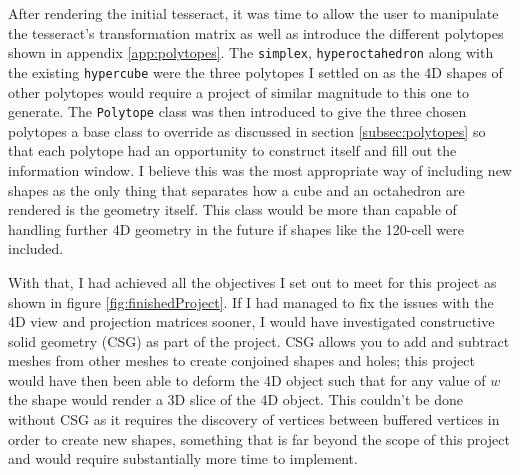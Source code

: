 \documentclass[11pt, a4paper]{article}
\begin{document}
After rendering the initial tesseract, it was time to allow the user to manipulate the tesseract's transformation matrix as well as introduce the different polytopes shown in appendix \ref{app:polytopes}. The \texttt{simplex}, \texttt{hyperoctahedron} along with the existing \texttt{hypercube} were the three polytopes I settled on as the 4D shapes of other polytopes would require a project of similar magnitude to this one to generate. The \texttt{Polytope} class was then introduced to give the three chosen polytopes a base class to override as discussed in section \ref{subsec:polytopes} so that each polytope had an opportunity to construct itself and fill out the information window. I believe this was the most appropriate way of including new shapes as the only thing that separates how a cube and an octahedron are rendered is the geometry itself. This class would be more than capable of handling further 4D geometry in the future if shapes like the 120-cell were included. 

With that, I had achieved all the objectives I set out to meet for this project as shown in figure \ref{fig:finishedProject}. If I had managed to fix the issues with the 4D view and projection matrices sooner, I would have investigated constructive solid geometry (CSG) as part of the project. CSG allows you to add and subtract meshes from other meshes to create conjoined shapes and holes; this project would have then been able to deform the 4D object such that for any value of $w$ the shape would render a 3D slice of the 4D object. This couldn't be done without CSG as it requires the discovery of vertices between buffered vertices in order to create new shapes, something that is far beyond the scope of this project and would require substantially more time to implement.

\cleardoublepage
\printbibliography[
  heading=bibintoc,
  title={Bibliography}
]
\end{document}
